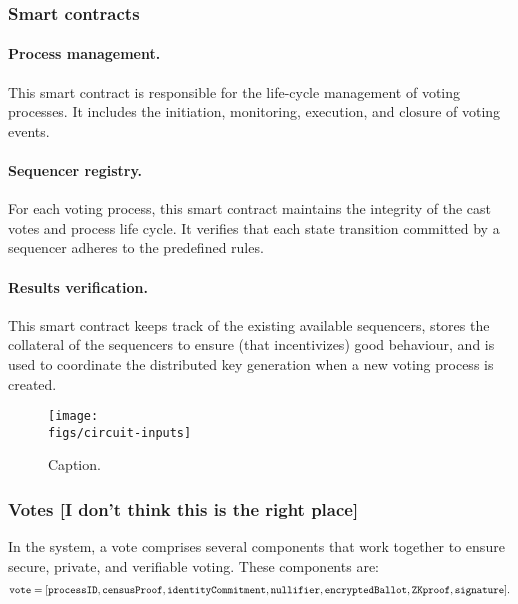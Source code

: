 \subsubsection{Smart contracts}

\paragraph{Process management.} This smart contract is responsible for the life-cycle management of voting processes. It includes the initiation, monitoring, execution, and closure of voting events.

\paragraph{Sequencer registry.} For each voting process, this smart contract maintains the integrity of the cast votes and process life cycle. It verifies that each state transition committed by a sequencer adheres to the predefined rules.

\paragraph{Results verification.} This smart contract keeps track of the existing available sequencers, stores the collateral of the sequencers to ensure (that incentivizes) good behaviour, and is used to coordinate the distributed key generation when a new voting process is created.\\



\begin{figure}[h]
	\centerline{\texttt{[image: \\figs/circuit-inputs]}}
	\caption{Caption.}
	\label{fig:circuit-inputs}
\end{figure}


\subsubsection{Votes [I don't think this is the right place]}

In the \davinci system, a vote comprises several components that work together to ensure secure, private, and verifiable voting. These components are:
\begin{align*}
		\texttt{vote} = [	\texttt{processID}, \texttt{censusProof}, \texttt{identityCommitment}, \texttt{nullifier},	
				 	\texttt{encryptedBallot}, \texttt{ZKproof}, \texttt{signature} ].
\end{align*}

